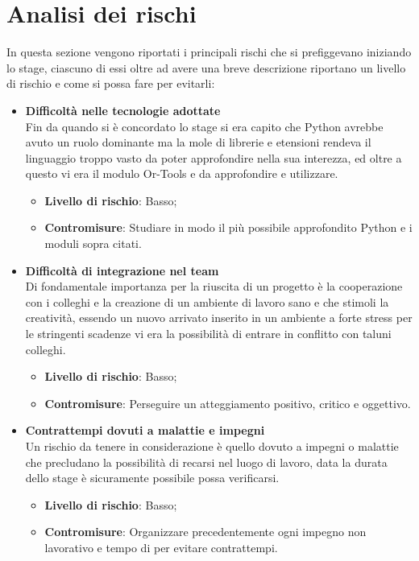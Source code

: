 \section{Analisi dei rischi}
In questa sezione vengono riportati i principali rischi che si prefiggevano iniziando lo stage, ciascuno di essi oltre ad avere una breve descrizione riportano un livello di rischio e come si possa fare per evitarli:
\begin{itemize}
	\item \textbf{Difficoltà nelle tecnologie adottate}\\
	Fin da quando si è concordato lo stage si era capito che Python avrebbe avuto un ruolo dominante ma la mole di librerie e etensioni rendeva il linguaggio troppo vasto da poter approfondire nella sua interezza, ed oltre a questo vi era il modulo Or-Tools e  da approfondire e utilizzare.
	\begin{itemize}
		\item \textbf{Livello di rischio}: Basso;
		\item \textbf{Contromisure}: Studiare in modo il più possibile approfondito Python e i moduli sopra citati.
	\end{itemize}
	\item \textbf{Difficoltà di integrazione nel team}\\
	Di fondamentale importanza per la riuscita di un progetto è la cooperazione con i colleghi e la creazione di un ambiente di lavoro sano e che stimoli la creatività, essendo un nuovo arrivato inserito in un ambiente a forte stress per le stringenti scadenze vi era la possibilità di entrare in conflitto con taluni colleghi.
	\begin{itemize}
		\item \textbf{Livello di rischio}: Basso;
		\item \textbf{Contromisure}: Perseguire un atteggiamento positivo, critico e oggettivo.
	\end{itemize}
	\item \textbf{Contrattempi dovuti a malattie e impegni}\\
	Un rischio da tenere in considerazione è quello dovuto a impegni o malattie che precludano la possibilità di recarsi nel luogo di lavoro, data la durata dello stage è sicuramente possibile possa verificarsi.
	\begin{itemize}
		\item \textbf{Livello di rischio}: Basso;
		\item \textbf{Contromisure}: Organizzare precedentemente ogni impegno non lavorativo e tempo di  per evitare contrattempi.

\end{itemize}
\end{itemize}
